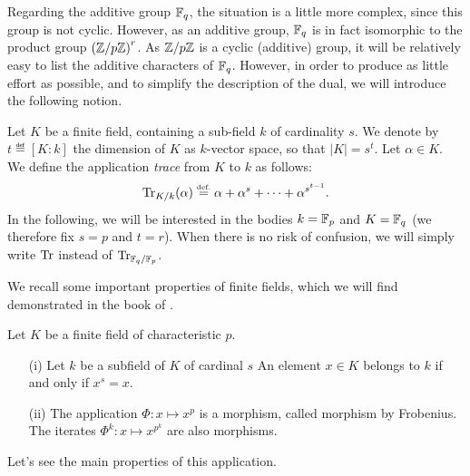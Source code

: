  
Regarding the additive group $ \mathbb{F}_q $, the situation is a little more complex, since this group is not cyclic. However, as an additive group, $ \mathbb{F}_q $ is in fact isomorphic to the product group $ \left(\mathbb{Z}/p \mathbb{Z} \right)^r $. As $ \mathbb{Z}/p \mathbb{Z} $ is a cyclic (additive) group, it will be relatively easy to list the additive characters of $ \mathbb{F}_q $. However, in order to produce as little effort as possible, and to simplify the description of the dual, we will introduce the following notion.
 
\begin{defn}
 \label{notation-26} Let $ K $ be a finite field,
containing a sub-field $ k $ of cardinality $ s $. We denote by $ t \eqdef [K: k] $ the dimension of $ K $ as $k$-vector space, so that $ | K | = s^t $. Let $ \alpha \in K $. We define the application \textit{trace} from $ K $ to $ k $ as follows:
\begin{equation*}
\operatorname{Tr}_{K / k} (\alpha) \stackrel{\mbox{\upshape\tiny def.}}{=} \alpha + \alpha^s + \cdots + \alpha^{s^{t-1}}.
\end{equation*}
In the following, we will be interested in the bodies $ k = \mathbb{F}_p $ and $ K = \mathbb{F}_q $ (we therefore fix $ s = p $ and $ t = r $). When there is no risk of confusion, we will simply write $ \operatorname{Tr} $ instead of $ \operatorname{Tr}_{\mathbb{F}_q / \mathbb{F}_p} $.
\end{defn}
 
We recall some important properties of finite fields, which we will find demonstrated in the book of  \cite{perrin}.
 
\begin{prop}
Let $ K $ be a finite field of characteristic $ p $. \begin{itemize}
\item [{\upshape (i)}] Let $ k $ be a subfield of $ K $ of cardinal $ s $ An element $ x \in K $ belongs to $ k $ if and only if $ x^s = x $.
\item [{\upshape (ii)}]   The application $ \Phi: x \mapsto x^p $ is a morphism, called morphism by Frobenius. The iterates $ \Phi^k: x \mapsto x^{p^k} $ are also morphisms.
\end{itemize}
\end{prop}
 
Let's see the main properties of this application.
 
